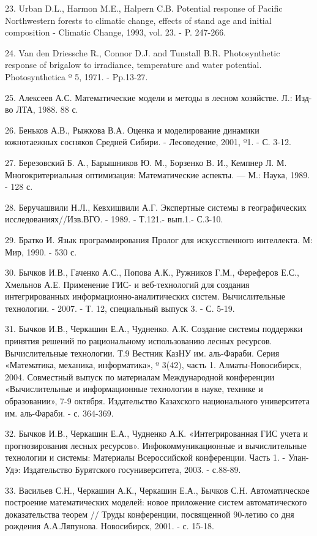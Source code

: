 \documentclass{article}
\begin{document}
23. Urban D.L., Harmon M.E., Halpern C.B. Potential response of Pacific Northwestern 
forests to climatic change, effects of stand age and initial composition - Climatic 
Change, 1993, vol. 23. - P. 247-266.

24. Van den Driessche R., Connor D.J. and Tunstall B.R. Photosynthetic response 
of brigalow to irradiance, temperature and water potential. Photosynthetica º 
5, 1971. - Pp.13-27.

25. Алексеев А.С. Математические модели и методы 
в лесном хозяйстве. Л.: Изд-во ЛТА, 1988. 88 с. 

26. Беньков А.В., Рыжкова В.А. Оценка и моделирование 
динамики южнотаежных сосняков Средней Сибири. 
- Лесоведение, 2001, º1. - С. 3-12.

27. Березовский Б. А., Барышников Ю. М., Борзенко 
В. И., Кемпнер Л. М. Многокритериальная оптимизация: 
Математические аспекты. --- М.: Наука, 1989. - 128 с.

28. Беручашвили Н.Л., Кевхишвили А.Г. Экспертные 
системы в географических исследованиях//Изв.ВГО. 
- 1989. - Т.121.- вып.1.- С.3-10.

29. Братко И. Язык программирования Пролог для 
искусственного интеллекта. М: Мир, 1990. - 530 с.

30. Бычков И.В., Гаченко А.С., Попова А.К., Ружников 
Г.М., Фереферов Е.С., Хмельнов А.Е. Применение 
ГИС- и веб-технологий для создания интегрированных 
информационно-аналитических систем. Вычислительные 
технологии. - 2007. - Т. 12, специальный выпуск 3. 
- С. 5-19.

31. Бычков И.В., Черкашин Е.А., Чудненко. А.К.  Создание 
системы поддержки принятия решений  по рациональному 
использованию лесных ресурсов. Вычислительные 
технологии. Т.9 Вестник КазНУ им. аль-Фараби. 
Серия «Математика, механика, информатика», 
º 3(42), часть 1. Алматы-Новосибирск, 2004. Совместный 
выпуск по материалам Международной конференции 
«Вычислительные и информационные технологии 
в науке, технике и образовании», 7-9 октября. 
Издательство Казахского национального университета 
им. аль-Фараби. - с. 364-369.

32. Бычков И.В., Черкашин Е.А., Чудненко А.К. «Интегрированная 
ГИС учета и прогнозирования лесных ресурсов». 
Инфокоммуникационные и вычислительные технологии 
и системы: Материалы Всероссийской конференции. 
Часть 1. - Улан-Удэ: Издательство Бурятского 
госуниверситета, 2003. - с.88-89.

33. Васильев С.Н., Черкашин А.К., Черкашин Е.А., 
Бычков С.Н. Автоматическое построение математических 
моделей: новое приложение систем автоматического 
доказательства теорем // Труды конференции, 
посвященной 90-летию со дня рождения А.А.Ляпунова. 
Новосибирск, 2001. - с. 15-18.
\end{document}
